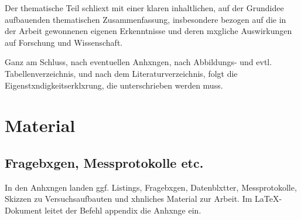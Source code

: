         Der thematische Teil schliext mit einer klaren inhaltlichen, auf der Grundidee aufbauenden thematischen Zusammenfassung, insbesondere bezogen auf die in der Arbeit gewonnenen eigenen Erkenntnisse und deren mxgliche Auswirkungen auf Forschung und Wissenschaft. 

        Ganz am Schluss, nach eventuellen Anhxngen, nach Abbildungs- und evtl. Tabellenverzeichnis, und nach dem Literaturverzeichnis, folgt die Eigenstxndigkeitserklxrung, die unterschrieben werden muss.

    \appendix

        \chapter{Material}

            \section{Fragebxgen, Messprotokolle etc.}

                In den Anhxngen landen ggf. Listings, Fragebxgen, Datenblxtter, Messprotokolle, Skizzen zu Versuchsaufbauten und xhnliches Material zur Arbeit. Im \LaTeX-Dokument leitet der Befehl appendix die Anhxnge ein.


        \listoffigures %
        \listoftables %


     
    

    \clearpage\thispagestyle{empty}
    \eigen  %

